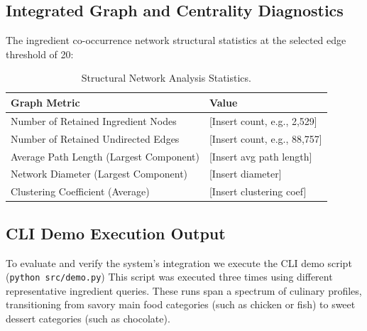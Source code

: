 \documentclass[11pt,a4paper]{article}
\begin{document}
\subsection{Integrated Graph and Centrality Diagnostics}
The ingredient co-occurrence network structural statistics at the selected edge threshold of 20:

\begin{table}[H]
\centering
\begin{tabular}{ll}
\toprule
\textbf{Graph Metric} & \textbf{Value} \\
\midrule
Number of Retained Ingredient Nodes & [Insert count, e.g., 2,529] \\
Number of Retained Undirected Edges & [Insert count, e.g., 88,757] \\
Average Path Length (Largest Component) & [Insert avg path length] \\
Network Diameter (Largest Component) & [Insert diameter] \\
Clustering Coefficient (Average) & [Insert clustering coef] \\
\bottomrule
\end{tabular}
\caption{Structural Network Analysis Statistics.}
\label{tab:graph_results_week14}
\end{table}

\subsection{CLI Demo Execution Output}
To evaluate and verify the system's integration we execute the CLI demo script (\texttt{python src/demo.py}) 
This script was executed three times using different representative ingredient queries. These runs span a spectrum of culinary profiles, transitioning from savory main food categories (such as chicken or fish) to sweet dessert categories (such as chocolate). 
\end{document}
